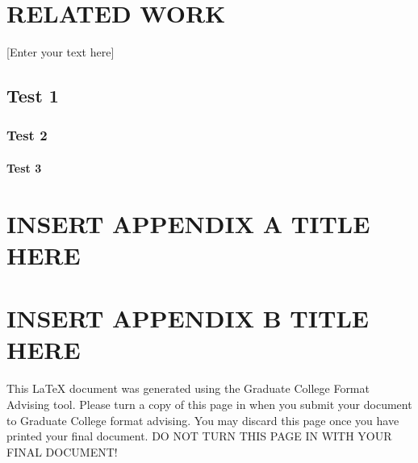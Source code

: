 \documentclass[oneside,11pt]{memoir}
\begin{document}
\chapter{RELATED WORK}

\DoubleSpacing
\setlength{\parindent}{.5in}
[Enter your text here]

\section{Test 1}
\subsection{Test 2}
\subsubsection{Test 3}



\vspace*{1in}
\begin{SingleSpace}
	

\end{SingleSpace}


\appendix
{}
\chapter{\uppercase{Insert Appendix A Title here}}
\clearpage
\chapter{\uppercase{Insert Appendix B Title here}}
\clearpage


This LaTeX document was generated using the Graduate College Format Advising tool. Please turn a copy of this page in when you submit your document to Graduate College format advising. You may discard this page once you have printed your final document. DO NOT TURN THIS PAGE IN WITH YOUR FINAL DOCUMENT!
\end{document}
